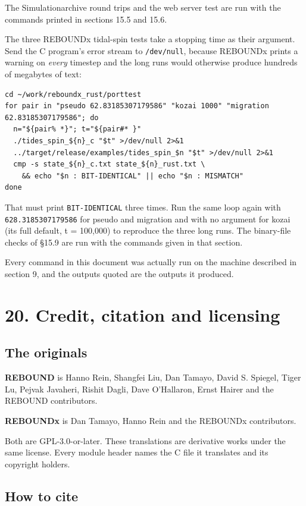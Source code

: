 \documentclass[11pt]{article}
\begin{document}
The Simulationarchive round trips and the web server test are run with the commands printed in sections 15.5 and 15.6.

The three REBOUNDx tidal-spin tests take a stopping time as their argument. Send the C program's error stream to \texttt{/dev/null}, because REBOUNDx prints a warning on \emph{every} timestep and the long runs would otherwise produce hundreds of megabytes of text:

\begin{lstlisting}
cd ~/work/reboundx_rust/porttest
for pair in "pseudo 62.83185307179586" "kozai 1000" "migration 62.83185307179586"; do
  n="${pair% *}"; t="${pair#* }"
  ./tides_spin_${n}_c "$t" >/dev/null 2>&1
  ../target/release/examples/tides_spin_$n "$t" >/dev/null 2>&1
  cmp -s state_${n}_c.txt state_${n}_rust.txt \
    && echo "$n : BIT-IDENTICAL" || echo "$n : MISMATCH"
done
\end{lstlisting}

That must print \texttt{BIT-IDENTICAL} three times. Run the same loop again with \texttt{628.3185307179586} for pseudo and migration and with no argument for kozai (its full default, t = 100,000) to reproduce the three long runs. The binary-file checks of \S{}15.9 are run with the commands given in that section.

Every command in this document was actually run on the machine described in section 9, and the outputs quoted are the outputs it produced.

\section{20. Credit, citation and licensing}

\subsection{The originals}

\textbf{REBOUND} is \textcopyright{} Hanno Rein, Shangfei Liu, Dan Tamayo, David S. Spiegel, Tiger Lu, Pejvak Javaheri, Rishit Dagli, Dave O'Hallaron, Ernst Hairer and the REBOUND contributors.

\textbf{REBOUNDx} is \textcopyright{} Dan Tamayo, Hanno Rein and the REBOUNDx contributors.

Both are GPL-3.0-or-later. These translations are derivative works under the same license. Every module header names the C file it translates and its copyright holders.

\subsection{How to cite}
\end{document}
